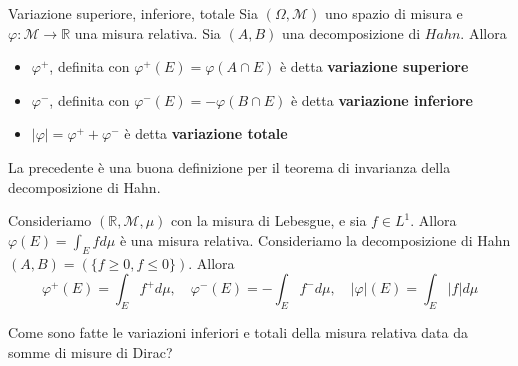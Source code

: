 \begin{definition}{Variazione superiore, inferiore, totale}
    Sia \((\Omega, \mathcal{M})\) uno spazio di misura e \(\varphi : \mathcal{M}
    \to \mathbb{R}\) una misura relativa. Sia \((A, B)\) una decomposizione di
    \(Hahn\). Allora
\begin{itemize}[label = --]
    \item \(\varphi^{+}\), definita con \(\varphi^{+}(E) = \varphi(A \cap E)\) è
        detta \textbf{variazione superiore}
    \item \(\varphi^{-}\), definita con \(\varphi^{-}(E) = -\varphi(B \cap E)\)
        è detta \textbf{variazione inferiore}
    \item \(|\varphi| = \varphi^{+} + \varphi^{-}\) è detta \textbf{variazione totale}
\end{itemize}
\end{definition}
\begin{remark}
    La precedente è una buona definizione per il teorema di invarianza della
    decomposizione di Hahn.
\end{remark}
\begin{example}
    Consideriamo \((\mathbb{R}, \mathcal{M}, \mu)\) con la misura di Lebesgue, e
    sia \(f \in L^{1}\). Allora \(\varphi(E) = \int_E f d\mu\) è una misura
    relativa. Consideriamo la decomposizione di Hahn \((A, B) = (\{ f \ge 0, f
    \le 0\})\). Allora
    \[
        \varphi^{+}(E) = \int_{E} f^{+} d\mu, \quad 
        \varphi^{-}(E) = -\int_{E} f^{-} d\mu, \quad 
        |\varphi|(E) = \int_{E} |f| d\mu
    \]
\end{example}
\begin{eser}
    Come sono fatte le variazioni inferiori e totali della misura relativa data
    da somme di misure di Dirac?
\end{eser}

